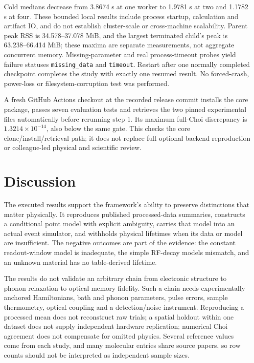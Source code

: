 \documentclass[11pt,a4paper]{article}
\newcommand{\code}[1]{\texttt{#1}}
\begin{document}
Cold medians decrease from 3.8674 s at one worker to 1.9781 s at two and 1.1782 s at four. These bounded local results include process startup, calculation and artifact IO, and do not establish cluster-scale or cross-machine scalability. Parent peak RSS is 34.578--37.078 MiB, and the largest terminated child's peak is 63.238--66.414 MiB; these maxima are separate measurements, not aggregate concurrent memory. Missing-parameter and real process-timeout probes yield failure statuses \code{missing\_data} and \code{timeout}. Restart after one normally completed checkpoint completes the study with exactly one resumed result. No forced-crash, power-loss or filesystem-corruption test was performed.

A fresh GitHub Actions checkout at the recorded release commit installs the core package, passes seven evaluation tests and retrieves the two pinned experimental files automatically before rerunning step 1. Its maximum full-Choi discrepancy is $1.3214\times10^{-14}$, also below the same gate. This checks the core clone/install/retrieval path; it does not replace full optional-backend reproduction or colleague-led physical and scientific review.



\section{Discussion}
The executed results support the framework's ability to preserve distinctions that matter physically. It reproduces published processed-data summaries, constructs a conditional point model with explicit ambiguity, carries that model into an actual event simulator, and withholds physical lifetimes when its data or model are insufficient. The negative outcomes are part of the evidence: the constant readout-window model is inadequate, the simple RF-decay models mismatch, and an unknown material has no table-derived lifetime.

The results do not validate an arbitrary chain from electronic structure to phonon relaxation to optical memory fidelity. Such a chain needs experimentally anchored Hamiltonians, bath and phonon parameters, pulse errors, sample thermometry, optical coupling and a detection/noise instrument. Reproducing a processed mean does not reconstruct raw trials; a spatial holdout within one dataset does not supply independent hardware replication; numerical Choi agreement does not compensate for omitted physics. Several reference values come from each study, and many molecular entries share source papers, so row counts should not be interpreted as independent sample sizes.
\end{document}
